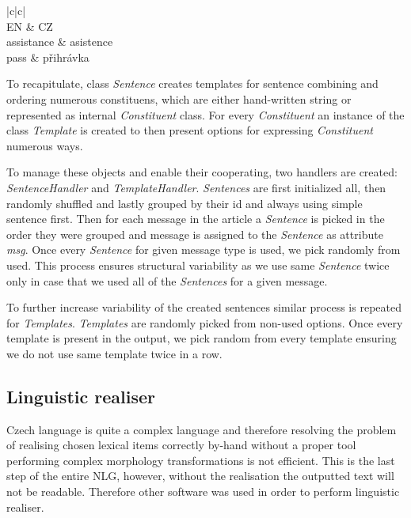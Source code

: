 \begin{center}
	\begin{tabular}{ |c|c| }
		\hline
		 \\ \hline
		 EN & CZ \\ \hline
		assistance  & asistence\\
		pass & přihrávka \\
		\hline
	\end{tabular}
\end{center}

To recapitulate, class \textit{Sentence} creates templates for sentence combining and ordering numerous constituens, which are either hand-written string or represented as internal \textit{Constituent} class. For every \textit{Constituent} an instance of the class \textit{Template} is created to then present options for expressing \textit{Constituent} numerous ways.

To manage these objects and enable their cooperating, two handlers are created: \textit{SentenceHandler} and \textit{TemplateHandler}. \textit{Sentences} are first initialized all, then randomly shuffled and lastly grouped by their id and always using simple sentence first. Then for each message in the article a \textit{Sentence} is picked in the order they were grouped and message is assigned to the \textit{Sentence} as attribute \textit{msg}. Once every \textit{Sentence} for given message type is used, we pick randomly from used. This process ensures structural variability as we use same \textit{Sentence} twice only in case that we used all of the \textit{Sentences} for a given message.

To further increase variability of the created sentences similar process is repeated for \textit{Templates}. \textit{Templates} are randomly picked from non-used options. Once every template is present in the output, we pick random from every template ensuring we do not use same template twice in a row.

\subsection{Linguistic realiser}
Czech language is quite a complex language and therefore resolving the problem of realising chosen lexical items correctly by-hand without a proper tool performing complex morphology transformations is not efficient. This is the last step of the entire NLG, however, without the realisation the outputted text will not be readable. Therefore other software was used in order to perform linguistic realiser.

